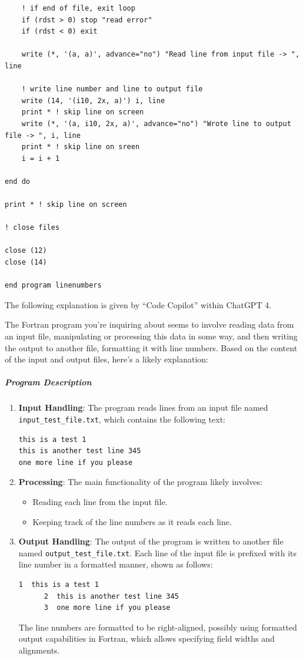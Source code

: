 \begin{verbatim}
    ! if end of file, exit loop
    if (rdst > 0) stop "read error"
    if (rdst < 0) exit

    write (*, '(a, a)', advance="no") "Read line from input file -> ", line

    ! write line number and line to output file
    write (14, '(i10, 2x, a)') i, line
    print * ! skip line on screen
    write (*, '(a, i10, 2x, a)', advance="no") "Wrote line to output file -> ", i, line
    print * ! skip line on sreen
    i = i + 1
        
end do

print * ! skip line on screen

! close files

close (12)
close (14)

end program linenumbers
\end{verbatim}

The following explanation is given by ``Code Copilot'' within ChatGPT 4.

The Fortran program you're inquiring about seems to involve reading data from an input file, manipulating or processing this data in some way, and then writing the output to another file, formatting it with line numbers. Based on the content of the input and output files, here's a likely explanation:

\subparagraph{Program Description}

\begin{enumerate}
\item \textbf{Input Handling}: The program reads lines from an input file named \texttt{input\_test\_file.txt}, which contains the following text:

\begin{verbatim}
this is a test 1
this is another test line 345
one more line if you please
\end{verbatim}


\item \textbf{Processing}: The main functionality of the program likely involves:

\begin{itemize}
\item Reading each line from the input file.
\item Keeping track of the line numbers as it reads each line.
\end{itemize}


\item \textbf{Output Handling}: The output of the program is written to another file named \texttt{output\_test\_file.txt}. Each line of the input file is prefixed with its line number in a formatted manner, shown as follows:

\begin{verbatim}
1  this is a test 1
      2  this is another test line 345
      3  one more line if you please
\end{verbatim}

The line numbers are formatted to be right-aligned, possibly using formatted output capabilities in Fortran, which allows specifying field widths and alignments.
\end{enumerate}


